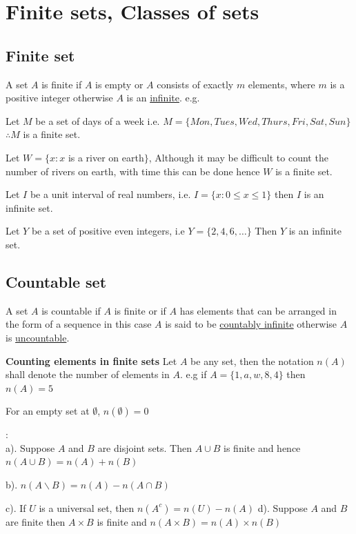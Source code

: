\section{Finite sets, Classes of sets}
\subsection{Finite set}

A set $A$ is finite if $A$ is empty or $A$ consists of exactly $m$ elements, where $m$ is a positive integer otherwise $A$ is an \underline{infinite}.
e.g.

Let $M$ be a set of days of a week i.e. $M = \{Mon, Tues, Wed,Thurs,Fri,Sat, Sun\}$ $\therefore M$ is a finite set.

Let $W = \{x: x$ is a river on earth$\}$, Although it may be difficult to count the number of rivers on earth, with time this can be done hence $W$ is a finite set.

Let $I$ be a unit interval of real numbers, i.e. $I = \{x: 0 \leq x \leq 1\}$ then $I$ is an infinite set.

Let $Y$ be a set of positive even integers, i.e $Y = \{2,4,6,\ldots\}$ Then $Y$ is an infinite set.
\subsection{Countable set}

A set $A$ is countable if $A$ is finite or if $A$ has elements that can be arranged in the form of a sequence in this case $A$ is said to be \underline{countably infinite} otherwise $A$ is \underline{uncountable}.
\vspace*{12pt}

\textbf{Counting elements in finite sets}
Let $A$ be any set, then the notation $n(A)$ shall denote the number of elements in $A$. e.g if $A = \{1,a,w,8,4\}$ then $n(A) = 5$

For an empty set at $\emptyset$, $n(\emptyset) = 0$

\begin{lemma}
    :\\
    a). Suppose $A$ and $B$ are disjoint sets. Then $A \cup B$ is finite and hence $n(A \cup B) = n(A) + n(B)$

    b). $n(A \backslash B) = n(A) - n(A \cap B)$

    c). If $U$ is a universal set, then $n(A^c) = n(U) - n(A)$
    d). Suppose $A$ and $B$ are finite then $A \times B$ is finite and $n(A \times B) = n(A) \times n(B)$
\end{lemma}


